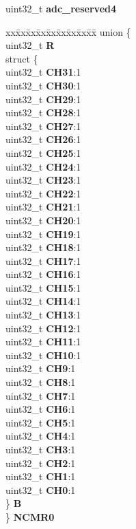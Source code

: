 \begin{DoxyCompactItemize}
\begin{tabbing}
\end{tabbing}\item 
\mbox{\label{structADC__tag_a750f4048ea054900fd425ec8ff4b9c32}} 
uint32\+\_\+t {\bfseries adc\+\_\+reserved4}
\item 
\mbox{\label{structADC__tag_adf645db408f6ca23575ebffaa9d10e27}} 
\begin{tabbing}
xx\=xx\=xx\=xx\=xx\=xx\=xx\=xx\=xx\=\kill
union \{\\
\>uint32\_t {\bfseries R}\\
\>struct \{\\
\>\>uint32\_t {\bfseries CH31}:1\\
\>\>uint32\_t {\bfseries CH30}:1\\
\>\>uint32\_t {\bfseries CH29}:1\\
\>\>uint32\_t {\bfseries CH28}:1\\
\>\>uint32\_t {\bfseries CH27}:1\\
\>\>uint32\_t {\bfseries CH26}:1\\
\>\>uint32\_t {\bfseries CH25}:1\\
\>\>uint32\_t {\bfseries CH24}:1\\
\>\>uint32\_t {\bfseries CH23}:1\\
\>\>uint32\_t {\bfseries CH22}:1\\
\>\>uint32\_t {\bfseries CH21}:1\\
\>\>uint32\_t {\bfseries CH20}:1\\
\>\>uint32\_t {\bfseries CH19}:1\\
\>\>uint32\_t {\bfseries CH18}:1\\
\>\>uint32\_t {\bfseries CH17}:1\\
\>\>uint32\_t {\bfseries CH16}:1\\
\>\>uint32\_t {\bfseries CH15}:1\\
\>\>uint32\_t {\bfseries CH14}:1\\
\>\>uint32\_t {\bfseries CH13}:1\\
\>\>uint32\_t {\bfseries CH12}:1\\
\>\>uint32\_t {\bfseries CH11}:1\\
\>\>uint32\_t {\bfseries CH10}:1\\
\>\>uint32\_t {\bfseries CH9}:1\\
\>\>uint32\_t {\bfseries CH8}:1\\
\>\>uint32\_t {\bfseries CH7}:1\\
\>\>uint32\_t {\bfseries CH6}:1\\
\>\>uint32\_t {\bfseries CH5}:1\\
\>\>uint32\_t {\bfseries CH4}:1\\
\>\>uint32\_t {\bfseries CH3}:1\\
\>\>uint32\_t {\bfseries CH2}:1\\
\>\>uint32\_t {\bfseries CH1}:1\\
\>\>uint32\_t {\bfseries CH0}:1\\
\>\} {\bfseries B}\\
\} {\bfseries NCMR0}\\


\end{tabbing}
\end{DoxyCompactItemize}
